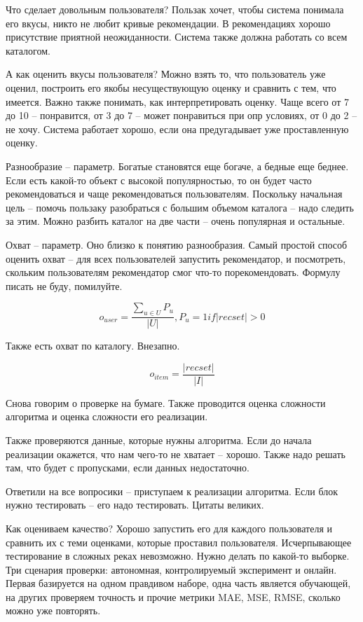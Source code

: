 Что сделает довольным пользователя? Пользак хочет, чтобы система понимала его вкусы, никто не любит кривые рекомендации. В рекомендациях хорошо присутствие приятной неожиданности. Система также должна работать со всем каталогом.

А как оценить вкусы пользователя? Можно взять то, что пользователь уже оценил, построить его якобы несуществующую оценку и сравнить с тем, что имеется. Важно также понимать, как интерпретировать оценку. Чаще всего от 7 до 10 -- понравится, от 3 до 7 -- может понравиться при опр условиях, от 0 до 2 -- не хочу. Система работает хорошо, если она предугадывает уже проставленную оценку.

Разнообразие -- параметр. Богатые становятся еще богаче, а бедные еще беднее. Если есть какой-то объект с высокой популярностью, то он будет часто рекомендоваться и чаще рекомендоваться пользователям. Поскольку начальная цель -- помочь пользаку разобраться с большим объемом каталога -- надо следить за этим. Можно разбить каталог на две части -- очень популярная и остальные.

Охват -- параметр. Оно близко к понятию разнообразия. Самый простой способ оценить охват -- для всех пользователей запустить рекомендатор, и посмотреть, скольким пользователям рекомендатор смог что-то порекомендовать. Формулу писать не буду, помилуйте.

\begin{equation}
    o_{user} = \frac{\sum_{u \in U} P_u}{|U|}, P_u = 1 if |recset| > 0
\end{equation}

Также есть охват по каталогу. Внезапно. 

\begin{equation}
    o_{item} = \frac{|recset|}{|I|}
\end{equation}


Снова говорим о проверке на бумаге. Также проводится оценка сложности алгоритма и оценка сложности его реализации.

Также проверяются данные, которые нужны алгоритма. Если до начала реализации окажется, что нам чего-то не хватает -- хорошо. Также надо решать там, что будет с пропусками, если данных недостаточно.

Ответили на все вопросики -- приступаем к реализации алгоритма. Если блок нужно тестировать -- его надо тестировать. Цитаты великих.

Как оцениваем качество? Хорошо запустить его для каждого пользователя и сравнить их с теми оценками, которые проставил пользователя. Исчерпывающее тестирование в сложных реках невозможно. Нужно делать по какой-то выборке. Три сценария проверки: автономная, контролируемый эксперимент и онлайн. Первая базируется на одном правдивом наборе, одна часть является обучающей, на других проверяем точность и прочие метрики MAE, MSE, RMSE, сколько можно уже повторять.

